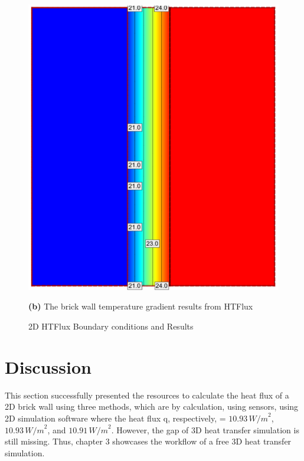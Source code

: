 \begin{figure}[tbh]
\begin{minipage}{0.45\textwidth}
  \includegraphics[width=\linewidth]{Figures/2dsim.png} 
  \caption*{\textbf{(b)} The brick wall temperature gradient results from HTFlux}
\end{minipage}
\caption{2D HTFlux Boundary conditions and Results}
\label{2dconst}
\end{figure}


\section{Discussion}
This section successfully presented the resources to calculate the heat flux of a 2D brick wall using three methods, which are by calculation, using sensors, using 2D simulation software where the heat flux q, respectively, = \( 10.93 \, {W/m}^2 \), \( 10.93 \, {W/m}^2 \), and \( 10.91 \, {W/m}^2 \). However, the gap of 3D heat transfer simulation is still missing. Thus, chapter 3 showcases the workflow of a free 3D heat transfer simulation.